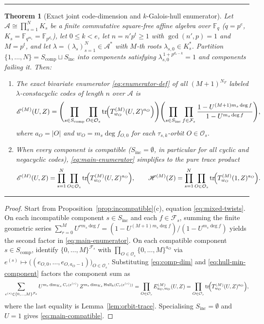\documentclass[preprint,12pt]{elsarticle}
\newcommand{\F}{\mathbb F}
\newcommand{\A}{\mathcal A}
\newcommand{\Fs}{\mathcal F_s}
\newcommand{\Os}{\mathcal O_s}
\newcommand{\Epoly}{\mathscr E}
\newcommand{\Hpoly}{\mathscr H}
\newcommand{\Hull}{\operatorname{Hull}}
\newcommand{\tr}{\operatorname{tr}}
\numberwithin{equation}{section}
\theoremstyle{plain}
\newtheorem{theorem}{Theorem}[section]
\theoremstyle{definition}
\theoremstyle{remark}
\newenvironment{keyresult}
  {\par\addvspace{3pt}\noindent\rule{\linewidth}{0.4pt}\par\nobreak\addvspace{3pt}}
  {\par\nobreak\addvspace{3pt}\noindent\rule{\linewidth}{0.4pt}\par\addvspace{3pt}}
\begin{document}
\begin{keyresult}
\begin{theorem}[Exact joint code-dimension and $k$-Galois-hull enumerator]\label{thm:main}
Let $\A\cong\prod_{s=1}^{N}K_s$ be a finite commutative square-free affine
algebra over $\F_q$ ($q=p^e$, $K_s=\F_{q^{m_s}}=\F_{p^{d_s}}$), let $0\le k<e$,
let $n=n'p^t\ge 1$ with $\gcd(n',p)=1$ and $M=p^t$, and let
$\lambda=(\lambda_s)_{s=1}^{N}\in\A^*$ with $M$-th roots $\lambda_{s,0}\in K_s^*$.
Partition $\{1,\dots,N\}=S_{\mathrm{comp}}\sqcup S_{\mathrm{inc}}$ into components
satisfying $\lambda_{s,0}^{\,1+p^{d_s-k}}=1$ and components failing it. Then:
\begin{enumerate}
\item[\textup{(a)}] The exact bivariate enumerator \eqref{eq:enumerator-def} of all
$(M+1)^{N_F}$ labeled $\lambda$-constacyclic codes of length $n$ over $\A$ is
\begin{equation}\label{eq:main-enumerator}
\Epoly^{(M)}(U,Z)
 =\Biggl(\prod_{s\in S_{\mathrm{comp}}}\prod_{O\in\Os}
    \tr\!\Bigl(T_{w_O}^{(M)}(U,Z)^{a_O}\Bigr)\Biggr)
  \Biggl(\prod_{s\in S_{\mathrm{inc}}}\prod_{f\in\Fs}
    \frac{1-U^{(M+1)m_s\deg f}}{1-U^{m_s\deg f}}\Biggr),
\end{equation}
where $a_O=|O|$ and $w_O=m_s\deg f_{O,0}$ for each $\tau_{s,k}$-orbit $O\in\Os$.
\item[\textup{(b)}] When every component is compatible ($S_{\mathrm{inc}}=\emptyset$,
in particular for all cyclic and negacyclic codes), \eqref{eq:main-enumerator}
simplifies to the pure trace product
\begin{equation}\label{eq:main-compatible}
\Epoly^{(M)}(U,Z)=\prod_{s=1}^{N}\prod_{O\in\Os}
 \tr\!\Bigl(T_{w_O}^{(M)}(U,Z)^{a_O}\Bigr),
\qquad
\Hpoly^{(M)}(Z)=\prod_{s=1}^{N}\prod_{O\in\Os}
 \tr\!\Bigl(T_{w_O}^{(M)}(1,Z)^{a_O}\Bigr).
\end{equation}
\end{enumerate}
\end{theorem}
\end{keyresult}

\begin{proof}
Start from Proposition~\ref{prop:incompatible}\textup{(c)}, equation
\eqref{eq:mixed-twists}. On each incompatible component $s\in S_{\mathrm{inc}}$
and each $f\in\Fs$, summing the finite geometric series
$\sum_{r=0}^{M}U^{r m_s\deg f}=(1-U^{(M+1)m_s\deg f})/(1-U^{m_s\deg f})$ yields
the second factor in \eqref{eq:main-enumerator}. On each compatible component
$s\in S_{\mathrm{comp}}$, identify $\{0,\dots,M\}^{\Fs}$ with
$\prod_{O\in\Os}\{0,\dots,M\}^{a_O}$ via $e^{(s)}\mapsto
\bigl((e_{O,0},\dots,e_{O,a_O-1})\bigr)_{O\in\Os}$. Substituting
\eqref{eq:comp-dim} and \eqref{eq:hull-min-component} factors the component sum as
\[
\sum_{e^{(s)}\in\{0,\dots,M\}^{\Fs}}
 U^{m_s\dim_{K_s}C_s(e^{(s)})}\,Z^{m_s\dim_{K_s}\Hull_k(C_s(e^{(s)}))}
 =\prod_{O\in\Os} E_{a_O,w_O}^{(M)}(U,Z)
 =\prod_{O\in\Os}\tr\!\Bigl(T_{w_O}^{(M)}(U,Z)^{a_O}\Bigr),
\]
where the last equality is Lemma~\ref{lem:orbit-trace}. Specialising
$S_{\mathrm{inc}}=\emptyset$ and $U=1$ gives \eqref{eq:main-compatible}.
\end{proof}
\end{document}
